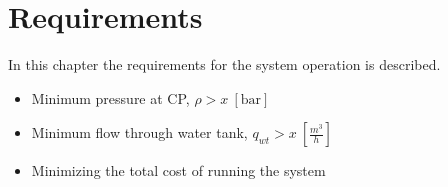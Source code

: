 \chapter{Requirements}
\label{Requirements}

In this chapter the requirements for the system operation is described. 



\begin{itemize}
	\item Minimum pressure at CP, $\rho > x \:[\text{bar}]$
%
	\item Minimum flow through water tank, $q_{wt} > x \:[\frac{m^3}{h}]$
%
	\item Minimizing the total cost of running the system
\end{itemize}